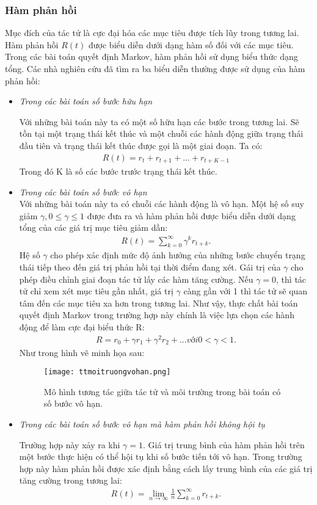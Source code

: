 \subsubsection{Hàm phản hồi}
Mục đích của tác tử là cực đại hóa các mục tiêu được tích lũy trong tương lai. Hàm phản hồi $R(t)$ được biểu diễn dưới dạng hàm số đối với các mục tiêu. Trong các bài toán quyết định Markov, hàm phản hồi sử dụng biểu thức dạng tổng. Các nhà nghiên cứu đã tìm ra ba biểu diễn thường được sử dụng của hàm phản hồi:
\begin{itemize}
\item \textit{Trong các bài toán số bước hữu hạn}

Với những bài toán này ta có một số hữu hạn các bước trong tương lai. Sẽ tồn tại một trạng thái kết thúc và một chuỗi các hành động giữa trạng thái đầu tiên và trạng thái kết thúc được gọi là một giai đoạn.
Ta có:
\begin{align*}
R(t)=r_{t}+r_{t+1}+...+r_{t+K-1}
\end{align*}
	Trong đó K là số các bước trước trạng thái kết thúc.
\item \textit{Trong các bài toán số bước vô hạn}\\
	Với những bài toán này ta có chuỗi các hành động là vô hạn. Một hệ số suy giảm $\gamma,0\leq \gamma \leq 1$ được đưa ra và hàm phản hồi được biểu diễn dưới dạng tổng của các giá trị mục tiêu giảm dần:
\begin{align*}
R(t)= \sum_{k=0}^{\infty} \gamma ^{k} r_{t+k}.
\end{align*}
Hệ số $\gamma$ cho phép xác định mức độ ảnh hưởng của những bước chuyển trạng thái tiếp theo đến giá trị phản hồi tại thời điểm đang xét. Gái trị của $\gamma$ cho phép điều chỉnh giai đoạn tác tử lấy các hàm tăng cường. Nếu $\gamma =0$, thì tác tử chỉ xem xét mục tiêu gần nhất, giá trị $\gamma$ càng gần với 1 thì tác tử sẽ quan tâm đến các mục tiêu xa hơn trong tương lai.
Như vậy, thực chất bài toán quyết định Markov trong trường hợp này chính là việc lựa chọn các hành động để làm cực đại biểu thức R:
\begin{align*}
R=r_{0}+\gamma r_{1}+\gamma^{2}r_{2}+... \textit{với} 0<\gamma <1.
\end{align*}
	Như trong hình vẽ minh họa sau:\\
	
\begin{figure}[ht]
    \centering
    \texttt{[image: ttmoitruongvohan.png]}
    \caption{Mô hình tương tác giữa tác tử và môi trường trong bài toán có số bước vô hạn.}
    \label{fig:tactumoitruong}
\end{figure}
\newpage
\item \textit{Trong các bài toán số bước vô hạn mà hàm phản hồi không hội tụ}

Trường hợp này xảy ra khi $\gamma = 1$. Giá trị trung bình của hàm phản hồi trên một bước thực hiện có thể hội tụ khi số bước tiến tới vô hạn. Trong trường hợp này hàm phản hồi được xác định bằng cách lấy trung bình của các giá trị tăng cường trong tương lai:
\begin{align*}
R(t)=\lim_{n\rightarrow \infty} \frac{1}{n}\sum_{k=0}^{\infty}r_{t+k}.
\end{align*}
\end{itemize}

